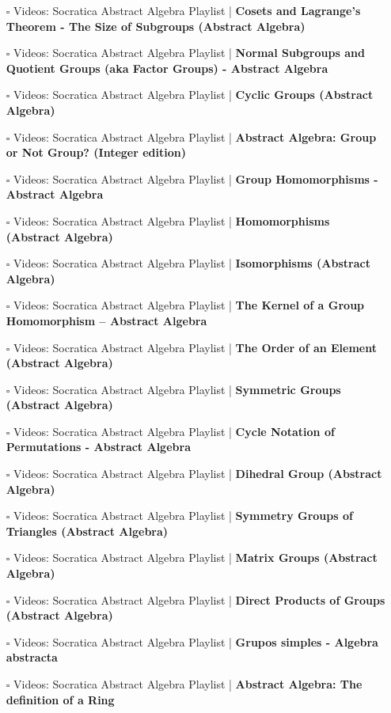 \documentclass[a4, landscape, 12pt]{article}
\newcommand{\checkbox}{$\square$}%
\begin{document}
\begin{itemize}
{}
\item [\checkbox] Videos: Socratica Abstract Algebra Playlist  | \textbf{Cosets and Lagrange’s Theorem - The Size of Subgroups (Abstract Algebra)
}
\item [\checkbox] Videos: Socratica Abstract Algebra Playlist  | \textbf{Normal Subgroups and Quotient Groups (aka Factor Groups) - Abstract Algebra
}
\item [\checkbox] Videos: Socratica Abstract Algebra Playlist  | \textbf{Cyclic Groups (Abstract Algebra)
}
\item [\checkbox] Videos: Socratica Abstract Algebra Playlist  | \textbf{Abstract Algebra: Group or Not Group? (Integer edition)
}
\item [\checkbox] Videos: Socratica Abstract Algebra Playlist  | \textbf{Group Homomorphisms - Abstract Algebra
}
\item [\checkbox] Videos: Socratica Abstract Algebra Playlist  | \textbf{Homomorphisms (Abstract Algebra)
}
\item [\checkbox] Videos: Socratica Abstract Algebra Playlist  | \textbf{Isomorphisms (Abstract Algebra)
}
\item [\checkbox] Videos: Socratica Abstract Algebra Playlist  | \textbf{The Kernel of a Group Homomorphism – Abstract Algebra
}
\item [\checkbox] Videos: Socratica Abstract Algebra Playlist  | \textbf{The Order of an Element (Abstract Algebra)
}
\item [\checkbox] Videos: Socratica Abstract Algebra Playlist  | \textbf{Symmetric Groups (Abstract Algebra)
}
\item [\checkbox] Videos: Socratica Abstract Algebra Playlist  | \textbf{Cycle Notation of Permutations - Abstract Algebra
}
\item [\checkbox] Videos: Socratica Abstract Algebra Playlist  | \textbf{Dihedral Group (Abstract Algebra)
}
\item [\checkbox] Videos: Socratica Abstract Algebra Playlist  | \textbf{Symmetry Groups of Triangles (Abstract Algebra)
}
\item [\checkbox] Videos: Socratica Abstract Algebra Playlist  | \textbf{Matrix Groups (Abstract Algebra)
}
\item [\checkbox] Videos: Socratica Abstract Algebra Playlist  | \textbf{Direct Products of Groups (Abstract Algebra)
}
\item [\checkbox] Videos: Socratica Abstract Algebra Playlist  | \textbf{Grupos simples - Algebra abstracta
}
\item [\checkbox] Videos: Socratica Abstract Algebra Playlist  | \textbf{Abstract Algebra: The definition of a Ring
}
\end{itemize}
\end{document}
